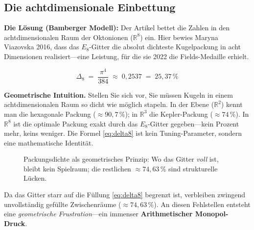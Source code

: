 \documentclass[11pt,a4paper]{article}
\newcommand{\R}{\mathbb{R}}
\newcommand{\Eoct}{E_8}
\begin{document}
\subsection{Die achtdimensionale Einbettung}

\textbf{Die Lösung (Bamberger Modell):} Der Artikel bettet die Zahlen in den achtdimensionalen Raum der Oktonionen ($\R^8$) ein. Hier bewies Maryna Viazovska 2016, dass das $\Eoct$-Gitter die absolut dichteste Kugelpackung in acht Dimensionen realisiert---eine Leistung, für die sie 2022 die Fields-Medaille erhielt.

\begin{equation}
  \Delta_8 \;=\; \frac{\pi^4}{384} \;\approx\; 0{,}2537 \;=\; 25{,}37\,\%
  \label{eq:delta8}
\end{equation}

\medskip
\noindent\textbf{Geometrische Intuition.} Stellen Sie sich vor, Sie müssen Kugeln in einem achtdimensionalen Raum so dicht wie möglich stapeln. In der Ebene ($\R^2$) kennt man die hexagonale Packung ($\approx 90{,}7\,\%$); in $\R^3$ die Kepler-Packung ($\approx 74\,\%$). In $\R^8$ ist die optimale Packung exakt durch das $\Eoct$-Gitter gegeben---kein Prozent mehr, keins weniger. Die Formel \eqref{eq:delta8} ist kein Tuning-Parameter, sondern eine mathematische Identität.

\begin{figure}[htbp]
  \centering
  \caption{Packungsdichte als geometrisches Prinzip: Wo das Gitter \emph{voll} ist, bleibt kein Spielraum; die restlichen $\approx 74{,}63\,\%$ sind strukturelle Lücken.}
\end{figure}

Da das Gitter starr auf die Füllung \eqref{eq:delta8} begrenzt ist, verbleiben zwingend unvollständig gefüllte Zwischenräume ($\approx 74{,}63\,\%$). An diesen Fehlstellen entsteht eine \emph{geometrische Frustration}---ein immenser \textbf{Arithmetischer Monopol-Druck}.
\end{document}
